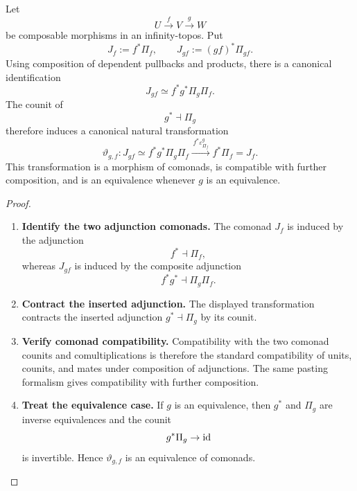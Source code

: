 \begin{lemma}
\label{lem:composite-base-change-comonad}
Let
\[
  U\xrightarrow{f}V\xrightarrow{g}W
\]
be composable morphisms in an infinity-topos. Put
\[
  J_f:=f^*\Pi_f,
  \qquad
  J_{gf}:=(gf)^*\Pi_{gf}.
\]
Using composition of dependent pullbacks and products, there is a canonical
identification
\[
  J_{gf}
  \simeq
  f^*g^*\Pi_g\Pi_f.
\]
The counit of
\[
  g^*\dashv\Pi_g
\]
therefore induces a canonical natural transformation
\[
  \vartheta_{g,f}:
  J_{gf}
  \simeq
  f^*g^*\Pi_g\Pi_f
  \xrightarrow{\,f^*\varepsilon^g_{\Pi_f}\,}
  f^*\Pi_f
  =
  J_f.
\]
This transformation is a morphism of comonads, is compatible with further
composition, and is an equivalence whenever \(g\) is an equivalence.
\end{lemma}

\begin{proof}
\leavevmode
\begin{enumerate}[label=\textup{(\arabic*)}]
    \item \textbf{Identify the two adjunction comonads.}
The comonad \(J_f\) is induced by the adjunction
\[
  f^*\dashv\Pi_f,
\]
whereas \(J_{gf}\) is induced by the composite adjunction
\[
  f^*g^*\dashv\Pi_g\Pi_f.
\]

    \item \textbf{Contract the inserted adjunction.}
The displayed transformation contracts the inserted adjunction
\(g^*\dashv\Pi_g\) by its counit.

    \item \textbf{Verify comonad compatibility.}
Compatibility with the two comonad counits
and comultiplications is therefore the standard compatibility of units,
counits, and mates under composition of adjunctions. The same pasting
formalism gives compatibility with further composition.

    \item \textbf{Treat the equivalence case.}
If \(g\) is an equivalence, then \(g^*\) and \(\Pi_g\) are inverse
equivalences and the counit
\[
  g^*\Pi_g\to\operatorname{id}
\]
is invertible. Hence \(\vartheta_{g,f}\) is an equivalence of comonads.
\end{enumerate}
\end{proof}

